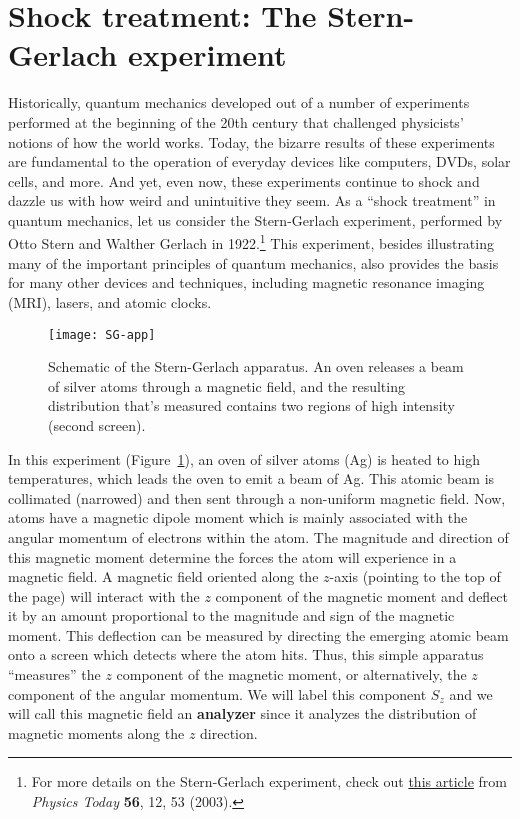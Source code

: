 \section[Shock treatment]{Shock treatment: The Stern-Gerlach experiment}
Historically, quantum mechanics developed out of a number of experiments performed at the beginning of the 20th century that challenged physicists' notions of how the world works. Today, the bizarre results of these experiments are fundamental to the operation of everyday devices like computers, DVDs, solar cells, and more. And yet, even now, these experiments continue to shock and dazzle us with how weird and unintuitive they seem. As a ``shock treatment'' in quantum mechanics, let us consider the Stern-Gerlach experiment, performed by Otto Stern and Walther Gerlach in 1922.\footnote{For more details on the Stern-Gerlach experiment, check out  \href{http://physicstoday.scitation.org/doi/10.1063/1.1650229}{this article} from \emph{Physics Today} \textbf{56}, 12, 53 (2003).} This experiment, besides illustrating many of the important principles of quantum mechanics, also provides the basis for many other devices and techniques, including magnetic resonance imaging (MRI), lasers, and atomic clocks. \par

\begin{figure}[!h]
	\centering
	\texttt{[image: SG-app]}
	\caption{Schematic of the Stern-Gerlach apparatus. An oven releases a beam of silver atoms through a magnetic field, and the resulting distribution that's measured contains two regions of high intensity (second screen).}
	\label{fig:SG-app}
\end{figure}

In this experiment (Figure~\ref{fig:SG-app}), an oven of silver atoms (Ag) is heated to high temperatures, which leads the oven to emit a beam of Ag. This atomic beam is collimated (narrowed) and then sent through a non-uniform magnetic field. Now, atoms have a magnetic dipole moment which is mainly associated with the angular momentum of electrons within the atom. The magnitude and direction of this magnetic moment determine the forces the atom will experience in a magnetic field. A magnetic field oriented along the $z$-axis (pointing to the top of the page) will interact with the $z$ component of the magnetic moment and deflect it by an amount proportional to the magnitude and sign of the magnetic moment. This deflection can be measured by directing the emerging atomic beam onto a screen which detects where the atom hits. Thus, this simple apparatus ``measures'' the $z$ component of the magnetic moment, or alternatively, the $z$ component of the angular momentum. We will label this component $S_z$ and we will call this magnetic field an \textbf{analyzer} since it analyzes the distribution of magnetic moments along the $z$ direction. \par

